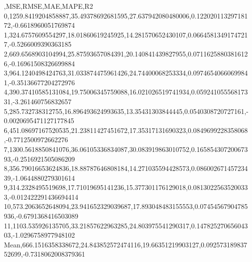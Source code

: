 ,MSE,RMSE,MAE,MAPE,R2
0,1259.8419204858887,35.49378692681595,27.637942080480006,0.12202011329718172,-0.6618960051769874
1,324.6757609554297,18.01860619245925,14.281570652430107,0.06645813491747217,-0.5266009390363185
2,669.6568903104994,25.87593657084391,20.140841439827955,0.07116258803816126,-0.16961508326699884
3,964.1240498424763,31.033874475961426,24.74400068253334,0.09746540660699841,-0.35136677204272976
4,390.37410585131084,19.75006345759088,16.021026519741934,0.05924105556817331,-3.261460756832657
5,285.732738312755,16.896493624993635,13.35431303844445,0.0540308720727161,-0.0020695471127177845
6,451.08697167520535,21.23811427451672,17.35317131690323,0.0849699228358068,-0.7712500972662276
7,1300.5618850841076,36.06105336834087,30.083919863010752,0.16585430720067393,-0.2516921505086209
8,356.79016653624836,18.88787646808184,14.271035594428573,0.08600267145723439,-1.0644880279301614
9,314.2328495519698,17.71019695141236,15.377301176129018,0.08130225635200333,-0.012422291436694414
10,573.2063652648094,23.941652329039687,17.893048483155553,0.07454567904785936,-0.6791368416503089
11,1103.535926135705,33.21857622963285,24.803975541290317,0.14782527065604303,-1.0296758977948102
Mean,666.1516358338672,24.843852572474116,19.66351219903127,0.09257318983752699,-0.7318062008379361
